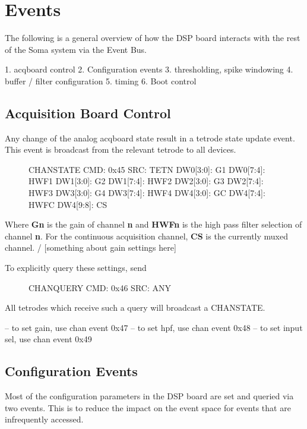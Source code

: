\section{Events}
The following is a general overview of how the DSP board interacts with the rest of the Soma system via the Event Bus. 

1. acqboard control
2. Configuration events
3. thresholding, spike windowing
4. buffer / filter configuration
5. timing 
6. Boot control

\subsection{Acquisition Board Control}
Any change of the analog acqboard state result in a tetrode state update event. This event is broadcast from the relevant tetrode to all devices. 

\begin{figure}[h]
\begin{event}{CHANSTATE}
CMD: 0x45
SRC: TETN
DW0[3:0]: G1
DW0[7:4]: HWF1
DW1[3:0]: G2
DW1[7:4]: HWF2
DW2[3:0]: G3
DW2[7:4]: HWF3
DW3[3:0]: G4
DW3[7:4]: HWF4
DW4[3:0]: GC
DW4[7:4]: HWFC
DW4[9:8]: CS
\end{event}
\end{figure}

Where \textbf{Gn} is the gain of channel \textbf{n} and \textbf{HWFn} is the high pass filter selection of channel \textbf{n}. For the continuous acquisition channel, \textbf{CS} is the currently muxed channel. 
/
[something about gain settings here] 

To explicitly query these settings, send 

\begin{figure}[h]
\begin{event}{CHANQUERY}
CMD: 0x46
SRC: ANY
\end{event}
\end{figure}

All tetrodes which receive such a query will broadcast a CHANSTATE. 

-- to set gain, use chan event 0x47
-- to set hpf, use chan event 0x48
-- to set input sel, use chan event 0x49



\subsection{Configuration Events}
Most of the configuration parameters in the DSP board are set and queried via two events. This is to reduce the impact on the event space for events that are infrequently accessed. 

